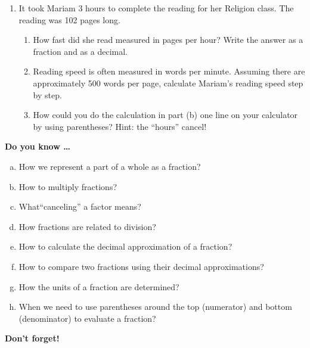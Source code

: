 \begin{enumerate}
\item It took Mariam 3 hours to complete the reading for her Religion class. The reading was 102 pages long.  
\begin{enumerate}
\item How fast did she read measured in pages per hour? Write the answer as a fraction and as a decimal. 
\vfill
\item Reading speed is often measured in words per minute.  Assuming there are approximately 500 words per page, calculate Mariam's reading speed step by step.
\vfill
\vfill
\item How could you do the calculation in part (b) one line on your calculator by using parentheses? Hint: the ``hours'' cancel! 
\vfill 
\end{enumerate}

\end{enumerate}

\newpage %



\bigskip

\noindent \textbf{Do you know \ldots}

\begin{enumerate}[(a)]
\item How we represent a part of a whole as a fraction? \vfill
\item How to multiply fractions?  \vfill
\item What``canceling'' a factor means? \vfill
\item How fractions are related to division? \vfill
\item How to calculate the decimal approximation of a fraction? \vfill
\item How to compare two fractions using their decimal approximations? \vfill
\item How the units of a fraction are determined?  \vfill
\item When we need to use parentheses around the top (numerator) and bottom (denominator) to evaluate a fraction? \vfill
\end{enumerate}

\noindent \textbf{Don't forget!}
\vfill \vfill \vfill




